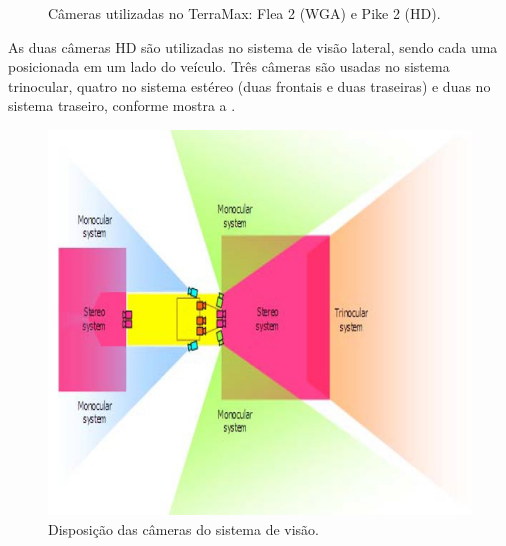 \begin{figure}[h]
\centering
{}\qquad
{}
\caption{Câmeras utilizadas no TerraMax: Flea 2 (WGA) e Pike 2 (HD).}%
\label{fig:cameras}%
\end{figure}

As duas câmeras HD são utilizadas no sistema de visão lateral, sendo cada uma posicionada em um lado do veículo. Três câmeras são usadas no sistema trinocular, quatro no sistema estéreo (duas frontais e duas traseiras) e duas no sistema traseiro, conforme mostra a .

\begin{figure}[h]
\centering
\includegraphics[width=0.75\columnwidth]{figs/vision.jpg}
\caption{Disposição das câmeras do sistema de visão.}%
\label{fig:vision}%
\end{figure}

